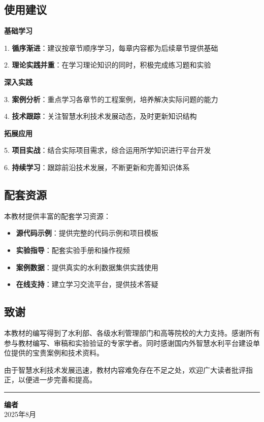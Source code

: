 \documentclass[12pt,a4paper]{ctexart}
\providecommand{\tightlist}{%
  \setlength{\itemsep}{0pt}\setlength{\parskip}{0pt}}
\begin{document}
\subsection{使用建议}\label{ux4f7fux7528ux5efaux8bae}

\begin{tcolorbox}[colback=green!5!white,colframe=green!75!black,title=学习路径建议]
\textbf{基础学习}

    1. \textbf{循序渐进}：建议按章节顺序学习，每章内容都为后续章节提供基础

    2. \textbf{理论实践并重}：在学习理论知识的同时，积极完成练习题和实验

\textbf{深入实践}

    3. \textbf{案例分析}：重点学习各章节的工程案例，培养解决实际问题的能力

    4. \textbf{技术跟踪}：关注智慧水利技术发展动态，及时更新知识结构

\textbf{拓展应用}

    5. \textbf{项目实战}：结合实际项目需求，综合运用所学知识进行平台开发

    6. \textbf{持续学习}：跟踪前沿技术发展，不断更新和完善知识体系

\end{tcolorbox}

\subsection{配套资源}\label{ux914dux5957ux8d44ux6e90}

本教材提供丰富的配套学习资源：

\begin{itemize}
\tightlist
\item
  \textbf{源代码示例}：提供完整的代码示例和项目模板
\item
  \textbf{实验指导}：配套实验手册和操作视频
\item
  \textbf{案例数据}：提供真实的水利数据集供实践使用
\item
  \textbf{在线支持}：建立学习交流平台，提供技术答疑
\end{itemize}

\subsection{致谢}\label{ux81f4ux8c22}

本教材的编写得到了水利部、各级水利管理部门和高等院校的大力支持。感谢所有参与教材编写、审稿和实验验证的专家学者。同时感谢国内外智慧水利平台建设单位提供的宝贵案例和技术资料。

由于智慧水利技术发展迅速，教材内容难免存在不足之处，欢迎广大读者批评指正，以便进一步完善和提高。

\begin{center}\rule{0.5\linewidth}{0.5pt}\end{center}

\textbf{编者}\\
2025年8月
\end{document}
